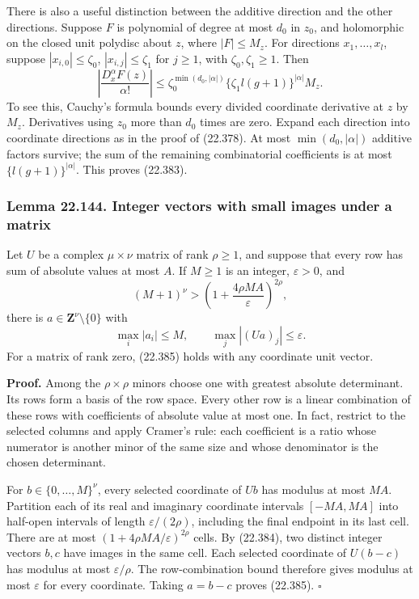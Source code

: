 \documentclass[
  11pt,
  a4paper,
]{article}
\begin{document}
There is also a useful distinction between the additive direction and
the other directions. Suppose \(F\) is polynomial of degree at most
\(d_0\) in \(z_0\), and holomorphic on the closed unit polydisc about
\(z\), where \(|F|\le M_z\). For directions \(x_1,\ldots,x_l\), suppose
\(|x_{i,0}|\le\zeta_0\), \(|x_{i,j}|\le\zeta_1\) for \(j\ge1\), with
\(\zeta_0,\zeta_1\ge1\). Then \[
 \left|\frac{D_x^\alpha F(z)}{\alpha!}\right|
 \le \zeta_0^{\min(d_0,|\alpha|)}
       \{\zeta_1 l(g+1)\}^{|\alpha|}M_z.
 \tag{22.383}
\] To see this, Cauchy's formula bounds every divided coordinate
derivative at \(z\) by \(M_z\). Derivatives using \(z_0\) more than
\(d_0\) times are zero. Expand each direction into coordinate directions
as in the proof of (22.378). At most \(\min(d_0,|\alpha|)\) additive
factors survive; the sum of the remaining combinatorial coefficients is
at most \(\{l(g+1)\}^{|\alpha|}\). This proves (22.383).

\subsubsection{Lemma 22.144. Integer vectors with small images under a
matrix}\label{lemma-22.144.-integer-vectors-with-small-images-under-a-matrix}

Let \(U\) be a complex \(\mu\times\nu\) matrix of rank \(\rho\ge1\), and
suppose that every row has sum of absolute values at most \(A\). If
\(M\ge1\) is an integer, \(\varepsilon>0\), and \[
 (M+1)^\nu>
        \left(1+\frac{4\rho MA}{\varepsilon}\right)^{2\rho},
 \tag{22.384}
\] there is \(a\in\mathbf Z^\nu\setminus\{0\}\) with \[
 \max_i|a_i|\le M,\qquad
 \max_j|(Ua)_j|\le\varepsilon.
 \tag{22.385}
\] For a matrix of rank zero, (22.385) holds with any coordinate unit
vector.

\textbf{Proof.} Among the \(\rho\times\rho\) minors choose one with
greatest absolute determinant. Its rows form a basis of the row space.
Every other row is a linear combination of these rows with coefficients
of absolute value at most one. In fact, restrict to the selected columns
and apply Cramer's rule: each coefficient is a ratio whose numerator is
another minor of the same size and whose denominator is the chosen
determinant.

For \(b\in\{0,\ldots,M\}^\nu\), every selected coordinate of \(Ub\) has
modulus at most \(MA\). Partition each of its real and imaginary
coordinate intervals \([-MA,MA]\) into half-open intervals of length
\(\varepsilon/(2\rho)\), including the final endpoint in its last cell.
There are at most \((1+4\rho MA/\varepsilon)^{2\rho}\) cells. By
(22.384), two distinct integer vectors \(b,c\) have images in the same
cell. Each selected coordinate of \(U(b-c)\) has modulus at most
\(\varepsilon/\rho\). The row-combination bound therefore gives modulus
at most \(\varepsilon\) for every coordinate. Taking \(a=b-c\) proves
(22.385). \(\square\)
\end{document}
